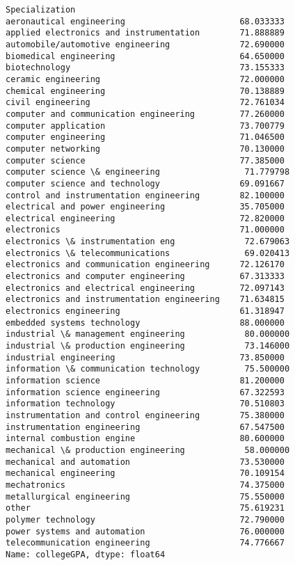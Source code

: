 \documentclass[11pt]{article}
\makeatletter
\newcommand{\boxspacing}{\kern\kvtcb@left@rule\kern\kvtcb@boxsep}
\newcommand{\prompt}[4]{
        \ttfamily\llap{{\color{#2}[#3]:\hspace{3pt}#4}}\vspace{-\baselineskip}
    }
\makeatother
\begin{document}
            \begin{tcolorbox}[breakable, size=fbox, boxrule=.5pt, pad at break*=1mm, opacityfill=0]
\prompt{Out}{outcolor}{51}{\boxspacing}
\begin{Verbatim}[commandchars=\\\{\}]
Specialization
aeronautical engineering                       68.033333
applied electronics and instrumentation        71.888889
automobile/automotive engineering              72.690000
biomedical engineering                         64.650000
biotechnology                                  73.155333
ceramic engineering                            72.000000
chemical engineering                           70.138889
civil engineering                              72.761034
computer and communication engineering         77.260000
computer application                           73.700779
computer engineering                           71.046500
computer networking                            70.130000
computer science                               77.385000
computer science \& engineering                 71.779798
computer science and technology                69.091667
control and instrumentation engineering        82.100000
electrical and power engineering               35.705000
electrical engineering                         72.820000
electronics                                    71.000000
electronics \& instrumentation eng              72.679063
electronics \& telecommunications               69.020413
electronics and communication engineering      72.126170
electronics and computer engineering           67.313333
electronics and electrical engineering         72.097143
electronics and instrumentation engineering    71.634815
electronics engineering                        61.318947
embedded systems technology                    88.000000
industrial \& management engineering            80.000000
industrial \& production engineering            73.146000
industrial engineering                         73.850000
information \& communication technology         75.500000
information science                            81.200000
information science engineering                67.322593
information technology                         70.510803
instrumentation and control engineering        75.380000
instrumentation engineering                    67.547500
internal combustion engine                     80.600000
mechanical \& production engineering            58.000000
mechanical and automation                      73.530000
mechanical engineering                         70.109154
mechatronics                                   74.375000
metallurgical engineering                      75.550000
other                                          75.619231
polymer technology                             72.790000
power systems and automation                   76.000000
telecommunication engineering                  74.776667
Name: collegeGPA, dtype: float64
\end{Verbatim}
\end{tcolorbox}
        
\end{document}
